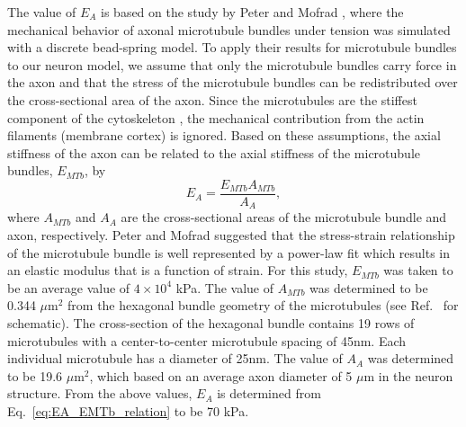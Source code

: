 \documentclass[]{interact}
\begin{document}
The value of $E_A$ is based on the study by Peter and Mofrad \citep{Peter:2012fc}, where the mechanical behavior of axonal microtubule bundles under tension was simulated with a discrete bead-spring model. To apply their results for microtubule bundles to our neuron model, we assume that only the microtubule bundles carry force in the axon and that the stress of the microtubule bundles can be redistributed over the cross-sectional area of the axon. Since the microtubules are the stiffest component of the cytoskeleton \citep{Fletcher:2010ku}, the mechanical contribution from the actin filaments (membrane cortex) is ignored. Based on these assumptions, the axial stiffness of the axon can be related to the axial stiffness of the microtubule bundles, $E_{MTb}$, by
%
\begin{equation}
E_A = \frac{E_{MTb} A_{MTb}}{A_A},
\label{eq:EA_EMTb_relation}
\end{equation}
%
where $A_{MTb}$ and $A_A$ are the cross-sectional areas of the microtubule bundle and axon, respectively. Peter and Mofrad \citep{Peter:2012fc} suggested that the stress-strain relationship of the microtubule bundle is well represented by a power-law fit which results in an elastic modulus that is a function of strain. For this study, $E_{MTb}$ was taken to be an average value of $4\times 10^{4}$ kPa. The value of $A_{MTb}$ was determined to be 0.344 $\mu$m${}^2$ from the hexagonal bundle geometry of the microtubules (see Ref.\ \citep{Peter:2012fc} for schematic). The cross-section of the hexagonal bundle contains 19 rows of microtubules with a center-to-center microtubule spacing of 45nm. Each  individual microtubule has a diameter of 25nm. The value of $A_A$ was determined to be 19.6 $\mu$m${}^2$, which based on an average axon diameter of 5 $\mu$m in the neuron structure. From the above values, $E_A$ is determined from Eq.\ \eqref{eq:EA_EMTb_relation} to be 70 kPa. 
\end{document}
